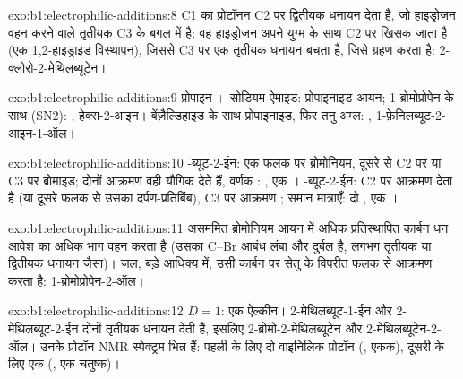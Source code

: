 \begin{solution}{exo:b1:electrophilic-additions:8}
C1 का प्रोटॉनन C2 पर द्वितीयक धनायन देता है, जो हाइड्रोजन वहन करने वाले तृतीयक
C3 के बगल में है; वह हाइड्रोजन अपने युग्म के साथ C2 पर खिसक जाता है (एक
1,2-हाइड्राइड विस्थापन), जिससे C3 पर एक तृतीयक धनायन बचता है, जिसे
 ग्रहण करता है: 2-क्लोरो-2-मेथिलब्यूटेन।
\end{solution}

\begin{solution}{exo:b1:electrophilic-additions:9}
प्रोपाइन + सोडियम ऐमाइड: प्रोपाइनाइड आयन; 1-ब्रोमोप्रोपेन के साथ (SN2):
, हेक्स-2-आइन। बेंज़ैल्डिहाइड के साथ प्रोपाइनाइड, फिर तनु
अम्ल: , 1-फ़ेनिलब्यूट-2-आइन-1-ऑल।
\end{solution}

\begin{solution}{exo:b1:electrophilic-additions:10}
-ब्यूट-2-ईन: एक फलक पर ब्रोमोनियम, दूसरे से C2 पर
या C3 पर ब्रोमाइड; दोनों आक्रमण वही यौगिक देते हैं, वर्णक :
, एक । -ब्यूट-2-ईन: C2 पर आक्रमण
 देता है (या दूसरे फलक से उसका दर्पण-प्रतिबिंब), C3 पर आक्रमण
; समान मात्राएँ: दो , एक ।
\end{solution}

\begin{solution}{exo:b1:electrophilic-additions:11}
असममित ब्रोमोनियम आयन में अधिक प्रतिस्थापित कार्बन धन आवेश का
अधिक भाग वहन करता है (उसका C--Br आबंध लंबा और दुर्बल है, लगभग
तृतीयक या द्वितीयक धनायन जैसा)। जल, बड़े आधिक्य में, उसी कार्बन पर
सेतु के विपरीत फलक से आक्रमण करता है: 1-ब्रोमोप्रोपेन-2-ऑल।
\end{solution}

\begin{solution}{exo:b1:electrophilic-additions:12}
$D = 1$: एक ऐल्कीन। 2-मेथिलब्यूट-1-ईन और 2-मेथिलब्यूट-2-ईन दोनों
तृतीयक धनायन देती हैं, इसलिए 2-ब्रोमो-2-मेथिलब्यूटेन और 2-मेथिलब्यूटेन-2-ऑल। उनके
प्रोटॉन NMR स्पेक्ट्रम भिन्न हैं: पहली के लिए दो वाइनिलिक प्रोटॉन (, एकक),
दूसरी के लिए एक (, एक चतुष्क)।
\end{solution}

